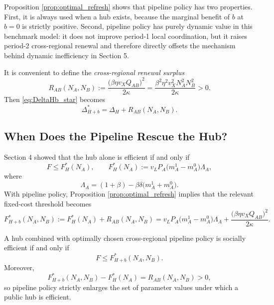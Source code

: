 Proposition \ref{prop:optimal_refresh} shows that pipeline policy has two properties. First, it is always used when a hub exists, because the marginal benefit of $b$ at $b=0$ is strictly positive. Second, pipeline policy has purely dynamic value in this benchmark model: it does not improve period-1 local coordination, but it raises period-2 cross-regional renewal and therefore directly offsets the mechanism behind dynamic inefficiency in Section 5.

It is convenient to define the \emph{cross-regional renewal surplus}
\begin{equation}
R_{AB}(N_A,N_B)
:=
\frac{\bigl(\beta \eta v_X Q_{AB}\bigr)^2}{2\kappa}
=
\frac{\beta^2\eta^2 v_X^2 N_A^2 N_B^2}{2\kappa}
>0.
\label{eq:refresh_surplus}
\end{equation}
Then \eqref{eq:DeltaHb_star} becomes
\begin{equation}
\Delta_{H+b}^*=\Delta_H+R_{AB}(N_A,N_B).
\label{eq:DeltaHb_star_compact}
\end{equation}

\subsection{When Does the Pipeline Rescue the Hub?}

Section 4 showed that the hub alone is efficient if and only if
\[
F\le F_H^*(N_A),
\qquad
F_H^*(N_A):=v_L P_A \bigl(m_A^1-m_A^0\bigr)\Lambda_A,
\]
where
\[
\Lambda_A=(1+\beta)-\beta\delta\bigl(m_A^1+m_A^0\bigr).
\]
With pipeline policy, Proposition \ref{prop:optimal_refresh} implies that the relevant fixed-cost threshold becomes
\begin{equation}
F_{H+b}^*(N_A,N_B)
:=
F_H^*(N_A)+R_{AB}(N_A,N_B)
=
v_L P_A \bigl(m_A^1-m_A^0\bigr)\Lambda_A
+
\frac{\bigl(\beta \eta v_X Q_{AB}\bigr)^2}{2\kappa}.
\label{eq:F_Hb_star}
\end{equation}

\begin{proposition}
\label{prop:hub_plus_refresh_efficiency}
A hub combined with optimally chosen cross-regional pipeline policy is socially efficient if and only if
\begin{equation}
F\le F_{H+b}^*(N_A,N_B).
\label{eq:hub_refresh_efficiency_condition}
\end{equation}
Moreover,
\begin{equation}
F_{H+b}^*(N_A,N_B)-F_H^*(N_A)=R_{AB}(N_A,N_B)>0,
\label{eq:threshold_expansion}
\end{equation}
so pipeline policy strictly enlarges the set of parameter values under which a public hub is efficient.
\end{proposition}

